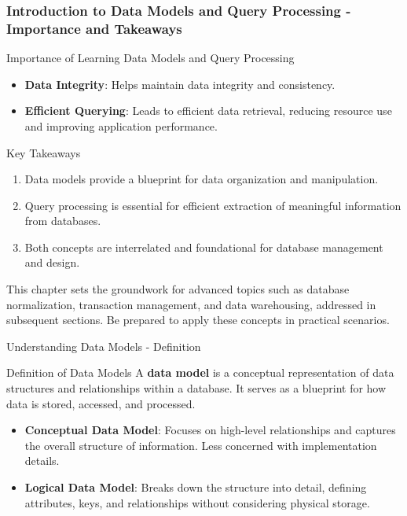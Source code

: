 \documentclass[aspectratio=169]{beamer}
\begin{document}
\begin{frame}[fragile]
    \frametitle{Introduction to Data Models and Query Processing - Importance and Takeaways}
    \begin{block}{Importance of Learning Data Models and Query Processing}
        \begin{itemize}
            \item \textbf{Data Integrity}: Helps maintain data integrity and consistency.
            \item \textbf{Efficient Querying}: Leads to efficient data retrieval, reducing resource use and improving application performance.
        \end{itemize}
    \end{block}

    \begin{block}{Key Takeaways}
        \begin{enumerate}
            \item Data models provide a blueprint for data organization and manipulation.
            \item Query processing is essential for efficient extraction of meaningful information from databases.
            \item Both concepts are interrelated and foundational for database management and design.
        \end{enumerate}
    \end{block}

    This chapter sets the groundwork for advanced topics such as database normalization, transaction management, and data warehousing, addressed in subsequent sections. Be prepared to apply these concepts in practical scenarios.
\end{frame}

\begin{frame}[fragile]{Understanding Data Models - Definition}
    \begin{block}{Definition of Data Models}
        A \textbf{data model} is a conceptual representation of data structures and relationships within a database. It serves as a blueprint for how data is stored, accessed, and processed.
    \end{block}
    
    \begin{itemize}
        \item \textbf{Conceptual Data Model}: Focuses on high-level relationships and captures the overall structure of information. Less concerned with implementation details.
        \item \textbf{Logical Data Model}: Breaks down the structure into detail, defining attributes, keys, and relationships without considering physical storage.
    \end{itemize}
\end{frame}
\end{document}
